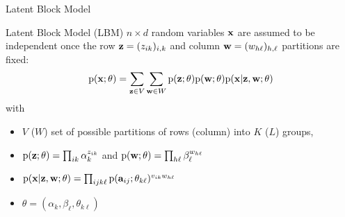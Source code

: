 \documentclass[10pt]{beamer}
\newcommand{\pdf}{\mbox{p}}
\newcommand{\ba}{\bold{a}}
\newcommand{\bx}{\bold{x}}
\newcommand{\bz}{\bold{z}}
\newcommand{\bw}{\bold{w}}
\begin{document}
\begin{frame}{Latent Block Model}
\begin{block}{Latent Block Model (LBM)}
$n \times d$ random variables $\bx$ are assumed to be independent once the row $\bz=(z_{ik})_{i,k}$ and column $\bw=(w_{h\ell})_{h,\ell}$ partitions are fixed:
\begin{eqnarray*}
\pdf(\bx;\theta) = \sum_{\bz\in V}\sum_{\bw\in W} \pdf(\bz;\theta)\pdf(\bw;\theta)\pdf(\bx|\bz,\bw;\theta)
\end{eqnarray*}
with
\begin{small}
\begin{itemize}
\item $V$ ($W$) set of possible partitions of rows (column) into $K$ ($L$) groups,
\item $\pdf(\bz;\theta)=\prod_{ik}\alpha_k^{z_{ik}}$ and $ \pdf(\bw;\theta)=\prod_{h\ell}\beta_{\ell}^{w_{h\ell}}$
\item $\pdf(\bx|\bz,\bw;\theta)=\prod_{ijk\ell} \pdf(\ba_{ij};\theta_{k\ell})^{v_{ik}w_{h\ell}}$%
\item $\theta=(\alpha_k,\beta_{\ell},\theta_{k\ell})$
\end{itemize}
\end{small}
\end{block}
\end{frame}
\end{document}
